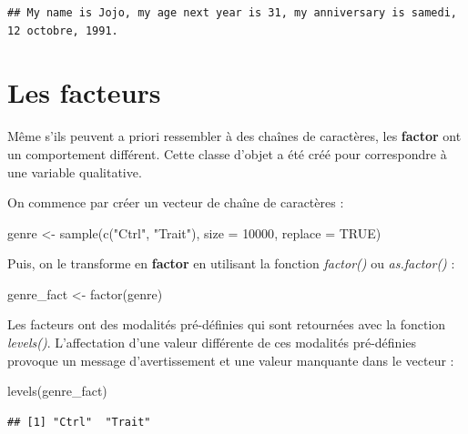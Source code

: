 \documentclass[
]{book}
\newenvironment{Shaded}{\begin{snugshade}}{\end{snugshade}}
\newcommand{\AttributeTok}[1]{\textcolor[rgb]{0.77,0.63,0.00}{#1}}
\newcommand{\ConstantTok}[1]{\textcolor[rgb]{0.00,0.00,0.00}{#1}}
\newcommand{\DecValTok}[1]{\textcolor[rgb]{0.00,0.00,0.81}{#1}}
\newcommand{\FunctionTok}[1]{\textcolor[rgb]{0.00,0.00,0.00}{#1}}
\newcommand{\NormalTok}[1]{#1}
\newcommand{\OtherTok}[1]{\textcolor[rgb]{0.56,0.35,0.01}{#1}}
\newcommand{\StringTok}[1]{\textcolor[rgb]{0.31,0.60,0.02}{#1}}
\theoremstyle{definition}
\theoremstyle{definition}
\theoremstyle{definition}
\theoremstyle{definition}
\theoremstyle{remark}
\begin{document}
\begin{verbatim}
## My name is Jojo, my age next year is 31, my anniversary is samedi, 12 octobre, 1991.
\end{verbatim}

\hypertarget{les-facteurs}{%
\section{Les facteurs}\label{les-facteurs}}

Même s'ils peuvent a priori ressembler à des chaînes de caractères, les \textbf{factor} ont un comportement différent. Cette classe d'objet a été créé pour correspondre à une variable qualitative.

On commence par créer un vecteur de chaîne de caractères :

\begin{Shaded}
\begin{Highlighting}[]
\NormalTok{genre }\OtherTok{\textless{}{-}} \FunctionTok{sample}\NormalTok{(}\FunctionTok{c}\NormalTok{(}\StringTok{"Ctrl"}\NormalTok{, }\StringTok{"Trait"}\NormalTok{), }\AttributeTok{size =} \DecValTok{10000}\NormalTok{, }\AttributeTok{replace =} \ConstantTok{TRUE}\NormalTok{)}
\end{Highlighting}
\end{Shaded}

Puis, on le transforme en \textbf{factor} en utilisant la fonction \emph{factor()} ou \emph{as.factor()} :

\begin{Shaded}
\begin{Highlighting}[]
\NormalTok{genre\_fact }\OtherTok{\textless{}{-}} \FunctionTok{factor}\NormalTok{(genre)}
\end{Highlighting}
\end{Shaded}

Les facteurs ont des modalités pré-définies qui sont retournées avec la fonction \emph{levels()}. L'affectation d'une valeur différente de ces modalités pré-définies provoque un message d'avertissement et une valeur manquante dans le vecteur :

\begin{Shaded}
\begin{Highlighting}[]
\FunctionTok{levels}\NormalTok{(genre\_fact)}
\end{Highlighting}
\end{Shaded}

\begin{verbatim}
## [1] "Ctrl"  "Trait"
\end{verbatim}
\end{document}
